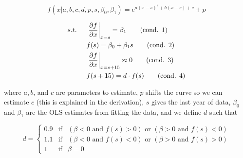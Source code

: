 \documentclass[10pt]{article}
\numberwithin{equation}{subsection}
\begin{document}
\begin{appendices}
\begin{equation}
   f(x|a, b, c, d, p, s, \beta_0, \beta_1) = e^{a(x-s)^2 + b(x-s) + c} + p
\end{equation}

\begin{align*}
   s.t. \hspace{5mm} &\left.\pdv{f}{x}\right|_{x=s} = \beta_1 \tag{cond. 1} \label{c1} \\
   &f(s) = \beta_0 + \beta_1 s \tag{cond. 2} \label{c2} \\
   &\left.\pdv{f}{x}\right|_{x=s + 15} \approx 0 \tag{cond. 3} \label{c3} \\
   &f(s + 15) = d \cdot f(s) \tag{cond. 4} \label{c4}
\end{align*}

\noindent
where \(a, b\), and \(c\) are parameters to estimate, \(p\) shifts the curve so we can estimate \(c\) (this is explained in the derivation), \(s\) gives the last year of data, \(\beta_0\) and \(\beta_1\) are the OLS estimates from fitting the data, and we define \(d\) such that

\[
   d = \left\{\begin{matrix}
      0.9 & \text{if} & (\beta < 0 \text{ and } f(s) > 0) \text{ or } (\beta > 0 \text{ and } f(s) < 0) \\
      1.1 & \text{if} & (\beta < 0 \text{ and } f(s) < 0) \text{ or } (\beta > 0 \text{ and } f(s) > 0) \\
      1 & \text{if} & \beta = 0
   \end{matrix}\right.
\]


\end{appendices}
\end{document}
